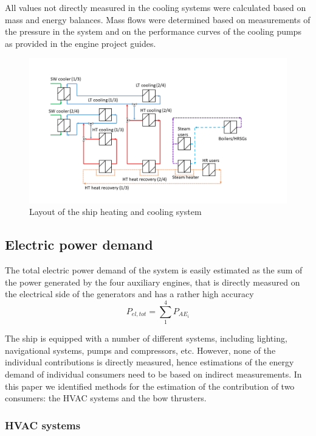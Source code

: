 \documentclass[preprint,12pt]{elsarticle}
\begin{document}
All values not directly measured in the cooling systems were calculated based on mass and energy balances. Mass flows were determined based on measurements of the pressure in the system and on the performance curves of the cooling pumps as provided in the engine project guides.

\begin{figure}
	\centering
	\includegraphics[width=0.9\linewidth]{Figures/GeneralSystemsSimplified}
	\caption{Layout of the ship heating and cooling system}
	\label{fig:generalsystemssimplified}
\end{figure}



\subsection{Electric power demand} \label{sec:met:electric}

The total electric power demand of the system is easily estimated as the sum of the power generated by the four auxiliary engines, that is directly measured on the electrical side of the generators and has a rather high accuracy
\begin{equation}
P_{el,tot} = \sum_{1}^{4} P_{AE_i}
\end{equation}

The ship is equipped with a number of different systems, including lighting, navigational systems, pumps and compressors, etc. However, none of the individual contributions is directly measured, hence estimations of the energy demand of individual consumers need to be based on indirect measurements. In this paper we identified methods for the estimation of the contribution of two consumers: the HVAC systems and the bow thrusters.

\subsubsection{HVAC systems}
\end{document}
